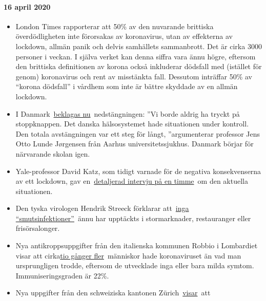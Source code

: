 \hypertarget{16-april-2020}{%
\paragraph{16 april 2020}\label{16-april-2020}}

\begin{itemize}
\tightlist
\item
  London Times rapporterar att 50\% av den nuvarande brittiska
  överdödligheten inte förorsakas av koronavirus, utan av effekterna av
  lockdown, allmän panik och delvis samhällets sammanbrott. Det är cirka
  3000 personer i veckan. I själva verket kan denna siffra vara ännu
  högre, eftersom den brittiska definitionen av korona också inkluderar
  dödsfall med (istället för genom) koronavirus och rent av misstänkta
  fall. Dessutom inträffar 50\% av ``korona dödsfall'' i vårdhem som
  inte är bättre skyddade av en allmän lockdown.
\item
  I
  Danmark~\href{https://jyllands-posten.dk/debat/breve/ECE12074246/vi-skulle-aldrig-have-trykket-paa-stopknappen/}{beklagas
  nu}~nedstängningen: ''Vi borde aldrig ha tryckt på stoppknappen. Det
  danska hälsosystemet hade situationen under kontroll. Den totala
  avstängningen var ett steg för långt, ''argumenterar professor Jens
  Otto Lunde Jørgensen från Aarhus universitetssjukhus. Danmark börjar
  för närvarande skolan igen.
\item
  Yale-professor David Katz, som tidigt varnade för de negativa
  konsekvenserna av ett lockdown, gav
  en~\href{https://www.youtube.com/watch?v=VK0Wtjh3HVA}{detaljerad
  intervju på en timme}~om den aktuella situationen.
\item
  Den tyska virologen Hendrik Streeck förklarar
  att~\href{https://today.rtl.lu/news/science-and-environment/a/1498185.html}{inga
  ``smutsinfektioner''}~ännu har upptäckts i stormarknader, restauranger
  eller frisörsalonger.
\item
  Nya antikroppsuppgifter från den italienska kommunen Robbio i
  Lombardiet visar att
  cirka\href{https://www.tgcom24.mediaset.it/cronaca/a-robbio-pv-il-22-ha-o-ha-avuto-il-coronavirus-ok-del-sindaco-ai-test-per-tutti_17285128-202002a.shtml}{tio
  gånger fler}~människor hade koronaviruset än vad man ursprungligen
  trodde, eftersom de utvecklade inga eller bara milda symtom.
  Immuniseringsgraden är 22\%.
\item
  Nya uppgifter från den schweiziska kantonen
  Zürich~\href{https://www.nzz.ch/zuerich/coronavirus-zuerich-aendert-nun-das-testregime-in-heimenauch-viele-aeltere-covid-19-infizierte-entwickeln-keine-symptome-zuerich-aendert-nun-das-testregime-in-heimen-ld.1552089}{visar}~att

\end{itemize}
